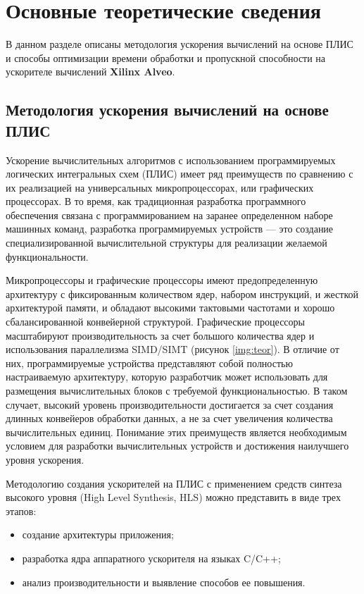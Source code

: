 \chapter{Основные теоретические сведения}

В данном разделе описаны методология ускорения вычислений на основе ПЛИС и способы
оптимизации времени обработки и пропускной способности на ускорителе
вычислений \textbf{Xilinx Alveo}.

\section{Методология ускорения вычислений на основе ПЛИС}

Ускорение вычислительных алгоритмов с использованием программируемых логических
интегральных схем (ПЛИС) имеет ряд преимуществ по сравнению с их реализацией на
универсальных микропроцессорах, или графических процессорах. В то время, как
традиционная разработка программного обеспечения связана с программированием на
заранее определенном наборе машинных команд, разработка программируемых
устройств --- это создание специализированной вычислительной структуры для
реализации желаемой функциональности.

Микропроцессоры и графические процессоры имеют предопределенную архитектуру с
фиксированным количеством ядер, набором инструкций, и жесткой архитектурой
памяти, и обладают высокими тактовыми частотами и хорошо сбалансированной
конвейерной структурой. Графические процессоры масштабируют производительность
за счет большого количества ядер и использования параллелизма SIMD/SIMT
(рисунок \ref{img:teor}). В отличие от них, программируемые устройства
представляют собой полностью настраиваемую архитектуру, которую разработчик
может использовать для размещения вычислительных блоков с требуемой
функциональностью. В таком случает, высокий уровень производительности
достигается за счет создания длинных конвейеров обработки данных, а не за счет
увеличения количества вычислительных единиц. Понимание этих преимуществ
является необходимым условием для разработки вычислительных устройств и
достижения наилучшего уровня ускорения.


Методологию создания ускорителей на ПЛИС с применением средств синтеза высокого
уровня (High Level Synthesis, HLS) можно представить в виде трех этапов:

\begin{itemize}
	\item создание архитектуры приложения;
	\item разработка ядра аппаратного ускорителя на языках C/C++;
	\item анализ производительности и выявление способов ее повышения.
\end{itemize}


